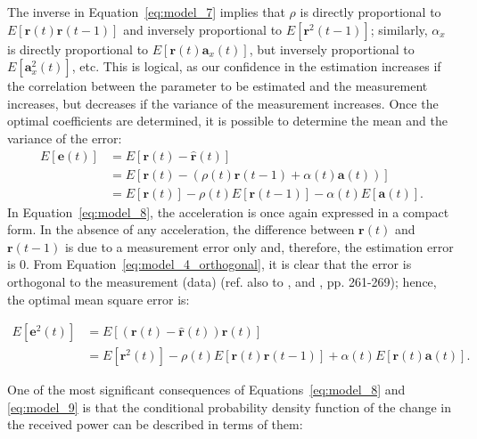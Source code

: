 The inverse in Equation~\ref{eq:model_7} implies that $\rho$ is directly proportional to $E[\mathbf{r}(t) \mathbf{r}(t-1)]$ and inversely proportional to $E[\mathbf{r}^2(t-1)]$; similarly, $\alpha_x$ is directly proportional to $E[\mathbf{r}(t)\mathbf{a}_x(t)]$, but inversely proportional to $E[\mathbf{a}^2_x(t)]$, etc. This is logical, as our confidence in the estimation increases if the correlation between the parameter to be estimated and the measurement increases, but decreases if the variance of the measurement increases. Once the optimal coefficients are determined, it is possible to determine the mean and the variance of the error:
\begin{align}
\label{eq:model_8}
    E \left [\mathbf{e} (t) \right ]    & = E \left [ \mathbf{r}(t) - \hat{\mathbf{r}}(t)\right ] \\ \nonumber
                                    & =  E \left [ \mathbf{r}(t) - \left ( \rho(t) \mathbf{r}(t - 1) + \alpha (t)\mathbf{a}(t) \right ) \right ] \\ \nonumber
                                    & = E \left [ \mathbf{r}(t) \right] - \rho (t) E \left [ \mathbf{r}(t-1) \right ] - \alpha (t) E \left [\mathbf{a} (t) \right ]. 
\end{align}
In Equation~\ref{eq:model_8}, the acceleration is once again expressed in a compact form. In the absence of any acceleration, the difference between $\mathbf{r}(t)$ and $\mathbf{r}(t-1)$ is due to a measurement error only and, therefore, the estimation error is 0. From Equation~\ref{eq:model_4_orthogonal}, it is clear that the error is orthogonal to the measurement (data) (ref. also to \cite{Liu2023, guo2011estimation}, and \cite{papoulis2002probability}, pp. 261-269); hence, the optimal mean square error is:

\begin{small}
\begin{align} 
\label{eq:model_9}
 E \left [ \mathbf{e}^2 (t)\right ] & =  E \left [ \left ( \mathbf{r}(t) - \hat{\mathbf{r}}(t) \right ) \mathbf{r}(t) \right ] \\ \nonumber 
     & = E \left [ \mathbf{r}^2(t) \right ] - \rho (t) E \left [ \mathbf{r}(t) \mathbf{r} (t-1) \right]  + 
 \alpha (t) E \left [ \mathbf{r}(t)\mathbf{a}(t) \right ].
\end{align}
\end{small}
One of the most significant consequences of Equations~\ref{eq:model_8} and \ref{eq:model_9} is that the conditional probability density function of the change in the received power can be described in terms of them:

